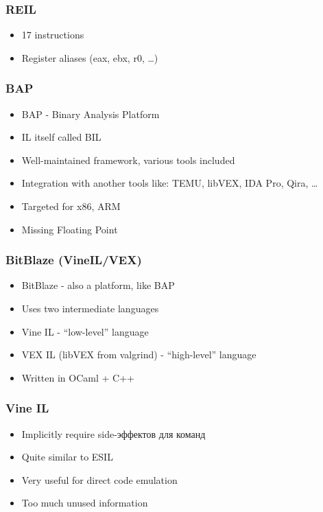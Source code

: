 \documentclass[10pt,pdf,utf8,english,compress,hyperref={unicode}]{beamer}
\begin{document}
\begin{frame}[fragile]
  \frametitle{REIL}
  \begin{itemize}
  \item 17 instructions
  \item Register aliases (eax, ebx, r0, \ldots) 
  \end{itemize}
\end{frame}

\begin{frame}[fragile]
  \frametitle{BAP}
  \begin{itemize}
  \item BAP - Binary Analysis Platform 
  \item IL itself called BIL
  \item Well-maintained framework, various tools included
  \item Integration with another tools like: TEMU, libVEX, IDA Pro, Qira, \ldots
  \item Targeted for x86, ARM
  \item Missing Floating Point
  \end{itemize}
\end{frame}

%

\begin{frame}[fragile]
  \frametitle{BitBlaze (VineIL/VEX)}
  \begin{itemize}
  \item BitBlaze  - also a platform, like BAP
  \item Uses two intermediate languages
  \item Vine IL - ``low-level'' language
  \item VEX IL (libVEX from valgrind) - ``high-level'' language
  \item Written in OCaml + C++
  \end{itemize}
\end{frame}

\begin{frame}[fragile]
  \frametitle{Vine IL  }
  \begin{itemize}
  \item Implicitly require side-эффектов для команд
  \item Quite similar to ESIL
  \item Very useful for direct code emulation
  \item Too much unused information
  \end{itemize}
\end{frame}
\end{document}
